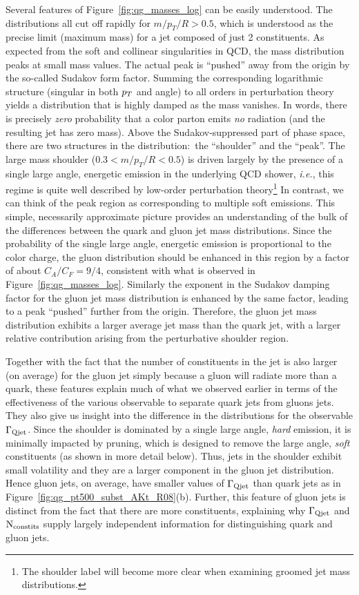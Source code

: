 Several features of Figure~\ref{fig:qg_masses_log} can be easily understood.  The distributions all cut off rapidly for $m/p_T/R > 0.5$, which is understood as
the precise limit (maximum mass) for a jet composed of just 2 constituents.  As expected from the soft and collinear singularities in QCD, the mass distribution peaks 
at small mass values.  The actual peak is ``pushed'' away from the origin by the so-called Sudakov form factor.  Summing the corresponding logarithmic structure 
(singular in both $p_T$ and angle) to all orders in perturbation theory yields a distribution that is highly damped  as the mass vanishes.  In words, there is precisely 
\textit{zero} probability that a color parton emits \textit{no} radiation (and the resulting jet has zero mass). Above the Sudakov-suppressed part of phase space, there are two 
structures in the distribution:~the ``shoulder'' and the ``peak''.
 The large mass shoulder ($0.3 < m/p_T/R < 0.5$) is driven largely by the presence of a single large angle, energetic
emission in the underlying QCD shower, \textit{i.e.}, this regime is quite well described by low-order perturbation theory\footnote{The shoulder label will become more clear when examining groomed jet mass distributions.} 
In contrast, we can think of the peak region as corresponding to multiple soft emissions.  This simple, necessarily approximate picture 
provides an understanding of the bulk of the
differences between the quark and gluon jet mass distributions.  Since the probability of the single large angle, energetic emission is proportional to the color charge,
the gluon distribution should be enhanced in this region by a factor of about $C_A/C_F = 9/4$, consistent with what is observed in Figure~\ref{fig:qg_masses_log}.
Similarly the exponent in the Sudakov damping factor for the gluon jet mass distribution  is enhanced by the same factor, 
leading to a peak ``pushed'' further from the origin.  Therefore, the gluon jet mass 
distribution exhibits a larger average jet mass than the quark jet, with a larger relative contribution arising from the perturbative shoulder region.  

 
Together with  the fact that the number of constituents in the jet is also larger (on average) for the gluon jet simply because a gluon will radiate more than a quark, these features explain much of what we observed earlier in terms of the effectiveness of the various observable to separate quark jets from gluons jets. They also give us insight into the difference in the distributions for the observable 
$\Gamma_{\rm Qjet}$. Since the shoulder is dominated by a single large angle, \textit{hard} emission, it is minimally impacted by pruning,
which is designed to remove the large angle, \textit{soft} constituents (as shown in more detail below). Thus, jets in the shoulder exhibit small volatility and they are a larger
component in the gluon jet distribution.  Hence gluon jets, on average, have smaller values of  $\Gamma_{\rm Qjet}$ than quark jets as in 
Figure~\ref{fig:qg_pt500_subst_AKt_R08}(b).  Further, this feature of gluon jets is distinct from the fact that there are more constituents, explaining why
$\Gamma_{\rm Qjet}$ and $\rm{N_ {constits}}$ supply largely independent information for distinguishing quark and gluon jets. 

